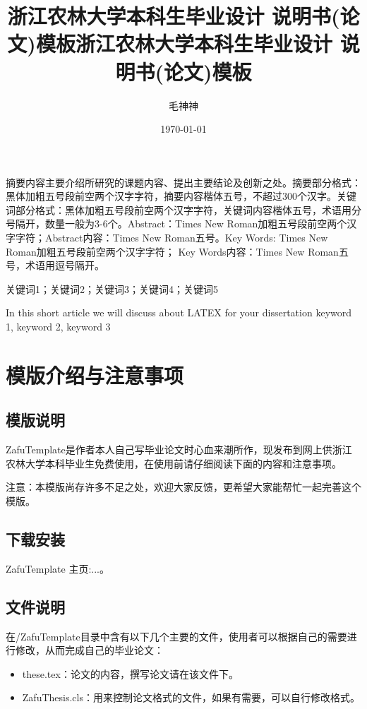 \documentclass[AutoFakeBold]{ZafuThesis}
\title{浙江农林大学本科生毕业设计 说明书(论文)模板}
\author{毛神神}
\date{\today}
\title{{浙江农林大学本科生毕业设计 }{说明书(论文)模板}}
\begin{document}
\customCover

\makestatement

\customContent

\frontmatter
\ZhAbstract
{
  摘要内容主要介绍所研究的课题内容、提出主要结论及创新之处。摘要部分格式：黑体加粗五号段前空两个汉字字符，摘要内容楷体五号，不超过300个汉字。关键词部分格式：黑体加粗五号段前空两个汉字字符，关键词内容楷体五号，术语用分号隔开，数量一般为3-6个。Abstract：Times New Roman加粗五号段前空两个汉字字符；Abstract内容：Times New Roman五号。Key Words: Times New Roman加粗五号段前空两个汉字字符； Key Words内容：Times New Roman五号，术语用逗号隔开。
  
}
{关键词1；关键词2；关键词3；关键词4；关键词5}


\EnAbstract
{In this short article we will discuss about LATEX for your dissertation}
{keyword 1, keyword 2, keyword 3}



\mainmatter
\section{模版介绍与注意事项}
\subsection{模版说明}
ZafuTemplate是作者本人自己写毕业论文时心血来潮所作，现发布到网上供浙江农林大学本科毕业生免费使用，在使用前请仔细阅读下面的内容和注意事项。\par
注意：本模版尚存许多不足之处，欢迎大家反馈，更希望大家能帮忙一起完善这个模版。
\subsection{下载安装}
ZafuTemplate 主页:...。
\subsection{文件说明}
在/ZafuTemplate目录中含有以下几个主要的文件，使用者可以根据自己的需要进行修改，从而完成自己的毕业论文：
\begin{itemize}
  \item these.tex：论文的内容，撰写论文请在该文件下。
  \item ZafuThesis.cls：用来控制论文格式的文件，如果有需要，可以自行修改格式。
\end{itemize}
\end{document}
